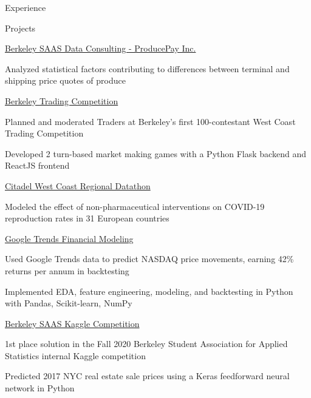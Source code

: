 \documentclass{resume} %
\begin{document}
\begin{rSection}{Experience}
\end{rSection}


\begin{rSection}{Projects}

\begin{rSubsection}{\href{https://www.producepay.com/}{Berkeley SAAS Data Consulting - ProducePay Inc.}}{}{}{}
    \item Analyzed statistical factors contributing to differences between terminal and shipping price quotes of produce
\end{rSubsection}

\begin{rSubsection}{\href{https://traders.berkeley.edu/}{Berkeley Trading Competition}}{}{}{}
    \item Planned and moderated Traders at Berkeley's first 100-contestant West Coast Trading Competition
    \item Developed 2 turn-based market making games with a Python Flask backend and ReactJS frontend
\end{rSubsection}

\begin{rSubsection}{\href{https://github.com/evilpegasus/datathon-spring-2021}{Citadel West Coast Regional Datathon}}{}{}{}
    \item Modeled the effect of non-pharmaceutical interventions on COVID-19 reproduction rates in 31 European countries
\end{rSubsection}

\begin{rSubsection}{\href{https://github.com/evilpegasus/google-trends-financial-modeling/}{Google Trends Financial Modeling}}{}{}{}
    \item Used Google Trends data to predict NASDAQ price movements, earning 42\% returns per annum in backtesting
    \item Implemented EDA, feature engineering, modeling, and backtesting in Python with Pandas, Scikit-learn, NumPy
\end{rSubsection}

\begin{rSubsection}{\href{https://www.kaggle.com/c/saas-2020-fall-cx-kaggle-compeition/}{Berkeley SAAS Kaggle Competition}}{}{}{}
    \item 1st place solution in the Fall 2020 Berkeley Student Association for Applied Statistics internal Kaggle competition
    \item Predicted 2017 NYC real estate sale prices using a Keras feedforward neural network in Python
\end{rSubsection}


\end{rSection}
\end{document}
